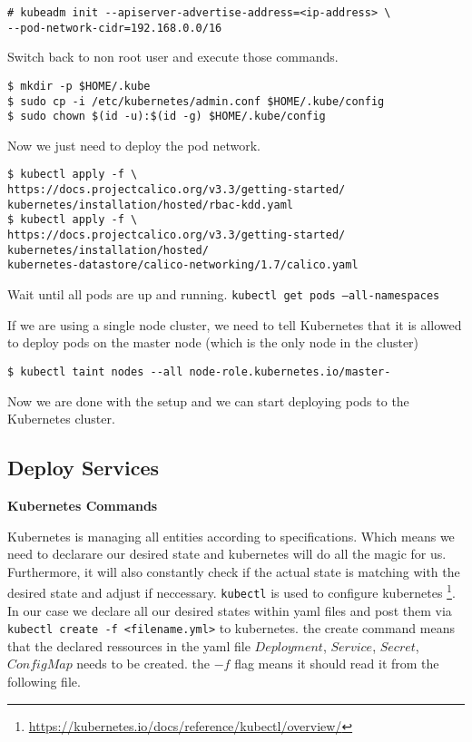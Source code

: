 \begin{verbatim}
# kubeadm init --apiserver-advertise-address=<ip-address> \
--pod-network-cidr=192.168.0.0/16
\end{verbatim}

Switch back to non root user and execute those commands.

\begin{verbatim}
$ mkdir -p $HOME/.kube
$ sudo cp -i /etc/kubernetes/admin.conf $HOME/.kube/config
$ sudo chown $(id -u):$(id -g) $HOME/.kube/config
\end{verbatim}


Now we just need to deploy the pod network.
\begin{verbatim}
$ kubectl apply -f \
https://docs.projectcalico.org/v3.3/getting-started/
kubernetes/installation/hosted/rbac-kdd.yaml
$ kubectl apply -f \
https://docs.projectcalico.org/v3.3/getting-started/
kubernetes/installation/hosted/
kubernetes-datastore/calico-networking/1.7/calico.yaml
\end{verbatim}

Wait until all pods are up and running.
\texttt{kubectl get pods --all-namespaces}

If we are using a single node cluster, we need to tell Kubernetes that it is allowed to deploy pods on the master node (which is the only node in the cluster)
\begin{verbatim}
$ kubectl taint nodes --all node-role.kubernetes.io/master-
\end{verbatim}

Now we are done with the setup and we can start deploying pods to the Kubernetes cluster.
\newpage
\subsection{Deploy Services}

\textbf{Kubernetes Commands}

Kubernetes is managing all entities according to specifications. Which means we need to declarare our desired state and kubernetes will do all the magic for us. Furthermore, it will also constantly check if the actual state is matching with the desired state and adjust if neccessary.
\texttt{kubectl} is used to configure kubernetes \footnote{\url{https://kubernetes.io/docs/reference/kubectl/overview/}}.
In our case we declare all our desired states within yaml files and post them via \texttt{kubectl create -f <filename.yml>} to kubernetes.
the create command means that the declared ressources in the yaml file $Deployment$, $Service$, $Secret$, $ConfigMap$ needs to be created. the $-f$ flag means it should read it from the following file.

